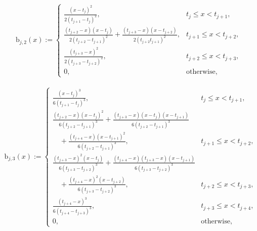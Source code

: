 \documentclass{iitthesis}
\theoremstyle{definition}
\theoremstyle{remark}
\begin{document}
\begin{align*}
  \text{b}_{j,2}(x):= \begin{cases} \displaystyle \frac{(x-t_{j})^2}{2(t_{j+1}-t_{j})^2}, & t_{j} \le x < t_{j+1},\\[1ex]
\displaystyle \frac{(t_{j+2}-x)(x-t_{j})}{2(t_{j+2}-t_{j+1})^2}+\frac{(t_{j+3}-x)(x-t_{j+2})}{2(t_{j+2}t_{j+1})^2}, & t_{j+1} \le x < t_{j+2},\\[1ex]
\displaystyle \frac{(t_{j+3}-x)^2}{2(t_{j+3}-t_{j+2})^2}, & t_{j+2} \le x < t_{j+3},\\[1ex]
\displaystyle  0, & \text{otherwise},
\end{cases}
\end{align*}

\begin{align*}
  \text{b}_{j,3}(x):= \begin{cases} \displaystyle \frac{(x-t_{j})^3}{6(t_{j+1}-t_{j})^3}, & t_{j} \le x < t_{j+1},\\[1ex]
\displaystyle \frac{(t_{j+2}-x)(x-t_{j})^2}{6(t_{j+2}-t_{j+1})^3}+\frac{(t_{j+3}-x)(x-t_{j})(x-t_{j+1})}{6(t_{j+2}-t_{j+1})^3}\\[1ex]\displaystyle\quad+\frac{(t_{j+4}-x)(x-t_{j+1})^2}{6(t_{j+2}-t_{j+1})^3},& t_{j+1} \le x < t_{j+2},\\[1ex]
\displaystyle \frac{(t_{j+3}-x)^2(x-t_{j})}{6(t_{j+3}-t_{j+2})^3}+\frac{(t_{j+4}-x)(t_{j+3}-x)(x-t_{j+1})}{6(t_{j+3}-t_{j+2})^3}\\[1ex]\displaystyle\quad+\frac{(t_{j+4}-x)^2(x-t_{j+2})}{6(t_{j+3}-t_{j+2})^3},& t_{j+2} \le x < t_{j+3},\\[1ex]
\displaystyle \frac{(t_{j+4}-x)^3}{6(t_{j+4}-t_{j+3})^3}, & t_{j+3} \le x < t_{j+4},\\[1ex]
\displaystyle  0, & \text{otherwise},
\end{cases}
\end{align*}

\end{document}
